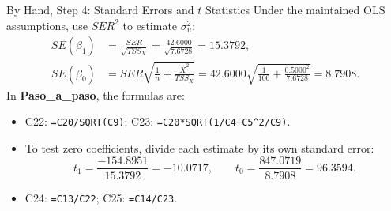\documentclass[notes,10pt, aspectratio=169]{beamer}
\begin{document}
\begin{frame}{By Hand, Step 4: Standard Errors and $t$ Statistics}
\small
Under the maintained OLS assumptions, use $SER^2$ to estimate $\sigma_u^2$:
\begin{align*}
SE(\widehat\beta_1)&=\frac{SER}{\sqrt{TSS_X}}
=\frac{42.6000}{\sqrt{7.6728}}=15.3792,\\
SE(\widehat\beta_0)&=SER\sqrt{\frac1n+\frac{\overline X^2}{TSS_X}}
=42.6000\sqrt{\frac1{100}+\frac{0.5000^2}{7.6728}}=8.7908.
\end{align*}
In \textbf{Paso\_a\_paso}, the formulas are:
\begin{itemize}
\item C22: \texttt{=C20/SQRT(C9)}; C23: \texttt{=C20*SQRT(1/C4+C5\^{}2/C9)}.
\item To test zero coefficients, divide each estimate by its own standard error:
\[
t_1=\frac{-154.8951}{15.3792}=-10.0717,\qquad
t_0=\frac{847.0719}{8.7908}=96.3594.
\]
\item C24: \texttt{=C13/C22}; C25: \texttt{=C14/C23}.
\end{itemize}
\end{frame}
\end{document}

